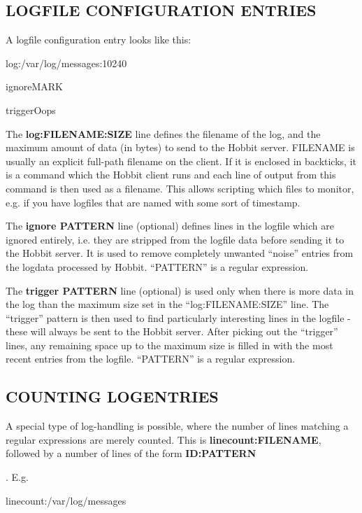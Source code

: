  
\subsection{LOGFILE CONFIGURATION ENTRIES}
 A logfile configuration entry looks like this: 

  
log:/var/log/messages:10240  
 
ignoreMARK  
 
triggerOops 


  The \textbf{log:FILENAME:SIZE} line defines the filename of the log,
  and the maximum amount of data (in bytes) to send to the Hobbit
  server. FILENAME is usually an explicit full-path filename on the
  client. If it is enclosed in backticks, it is a command which the
  Hobbit client runs and each line of output from this command is then
  used as a filename. This allows scripting which files to monitor,
  e.g. if you have logfiles that are named with some sort of
  timestamp. 



  The \textbf{ignore PATTERN} line (optional) defines lines in the
  logfile which are ignored entirely, i.e. they are stripped from the
  logfile data before sending it to the Hobbit server. It is used to
  remove completely unwanted ``noise'' entries from the logdata
  processed by Hobbit. ``PATTERN'' is a regular expression. 



  The \textbf{trigger PATTERN}
 line (optional) is used only when there is more data in the log than
 the maximum size set in the ``log:FILENAME:SIZE'' line. The
 ``trigger'' pattern is then used to find particularly interesting
 lines in the logfile - these will always be sent to the Hobbit
 server. After picking out the ``trigger'' lines, any remaining space
 up to the maximum size is filled in with the most recent entries from
 the logfile. ``PATTERN'' is a regular expression. 



 
\subsection{COUNTING LOGENTRIES}
 A special type of log-handling is possible, where the number of lines
 matching a regular expressions are merely counted. This is
 \textbf{linecount:FILENAME}, followed by a number of lines of the
 form \textbf{ID:PATTERN}

. E.g. 

  
linecount:/var/log/messages  
 
